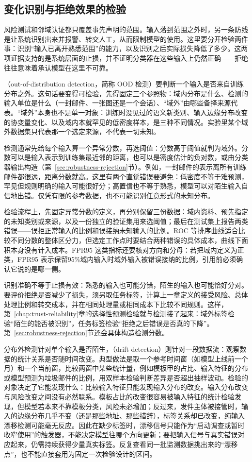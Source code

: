 \subsection{变化识别与拒绝效果的检验}
\label{sec:robustness-monitor-test}

风险测试和邻域认证都只覆盖事先声明的范围。输入落到范围之外时，另一条防线是让系统识别出来并报警、转交人工，从而限制模型的使用。这里要分开检验两件事：识别“输入已离开熟悉范围”的能力，以及识别之后实际损失降低了多少。这两项证据支持的是系统层面的止损，并不证明分类器在这些输入上仍然正确——拒绝往往意味着承认模型在这里不可靠。

（out-of-distribution detection，简称 OOD 检测）要判断一个输入是否来自训练分布之外。这句话要变得可检验，先得固定三个参照物：域内分布是什么、检测的输入单位是什么（一封邮件、一张图还是一个会话）、“域外”由哪些备择来源代表。“域外”本身也不是单一对象：训练时没见过的语义新类别、输入边缘分布改变的协变量变化、以及域内本就罕见的低密度样本，是三种不同情况。实验里某个域外数据集只代表那一个选定来源，不代表一切未知。

检测通常先给每个输入算一个异常分数，再选阈值：分数高于阈值就判为域外。分数可以是输入表示到训练集最近邻的距离，也可以是密度估计的负对数，或由分类器输出构造（第~\ref{sec:robustness-rejection}节）。例如，一封邮件的表示离所有训练邮件都很远，距离分数就高。这里有两个直觉错误要避免：低密度不等于难预测，罕见但规则明确的输入可能很好分；高置信也不等于熟悉，模型可以对陌生输入自信地出错。仅凭有限的参考数据，也不可能识别任意形式的未知分布。

检验流程上，先固定异常分数的定义，再分别保留三份数据：域内资料、预先指定的未知类别或来源，以及一份独立的验证集用来选阈值；最后在测试集上报告两类错误——误拒正常输入的比例和误接纳未知输入的比例。ROC 等排序曲线适合比较不同分数的整体区分力，但选定工作点时要结合两种错误的具体成本，曲线下面积本身没有计入成本。FPR95 这类指标还要核对方向和分母：若把域内定义为正类，FPR95 表示保留95\%域内输入时域外输入被错误接纳的比例，引用前必须确认它说的是哪一侧。

识别准确不等于止损有效：熟悉的输入也可能分错，陌生的输入也可能恰好分对。要评价拒绝是否减少了损失，须另取任务标签，计算上一章定义的接受风险、总体处理比例和转交成本，并在相同处理量或相同成本下比较不同规则。这样，第~\ref{chap:trust-reliability}章的选择性预测检验就与检测接了起来：域外标签检验“陌生的能否被识别”，任务标签检验“拒绝之后错误是否真的下降”。第~\ref{sec:robustness-rejection}节还会具体构造检测分数。

分布外检测针对单个输入是否陌生，（drift detection）则针对一段数据流：观察数据的统计关系是否随时间改变。典型做法是取一个参考时间窗（如模型上线前一个月）和一个当前窗，比较两窗中某些统计量，例如模板甲的占比、输入特征的分布或模型预测为垃圾邮件的比例，用双样本检验判断差异是否超出抽样波动。检验的对象决定了它能发现什么：比较输入特征只能发现输入分布的改变。输入分布改变与风险改变之间没有必然联系。模板占比的改变很容易被输入特征的统计检验发现，但模型若本来不靠模板分类，风险未必增加；反过来，发件主体被接管时，输入的边缘分布几乎不变（还是那些地址、那些措辞），标签关系却已改变，纯输入漂移检测可能毫无反应。因此在缺少标签时，漂移信号只能作为“启动调查或暂时收窄使用”的触发器，不能决定模型往哪个方向更新；要把输入信号与真实错误对应起来，仍需持续获得少量真实标签。反复查看同一批监测数据挑出来的“漂移点”，也不能直接套用为固定一次检验设计的区间。

